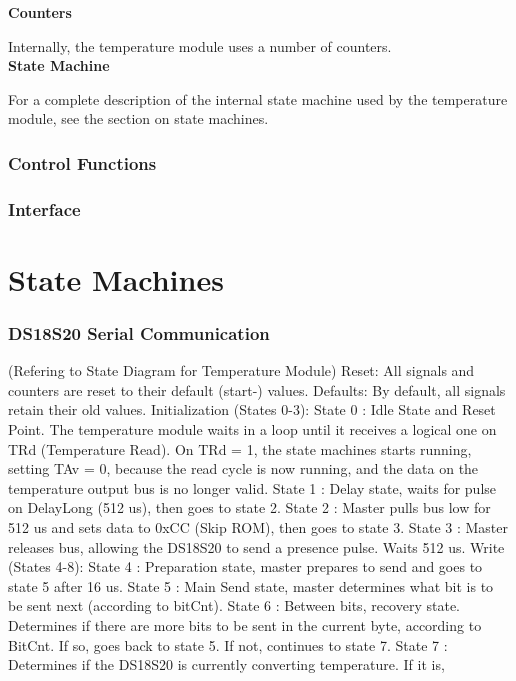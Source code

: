\documentclass[a4paper,11pt]{article}
\begin{document}
{\noindent \bf Counters}

Internally, the temperature module uses a number of counters.\\

{\noindent \bf State Machine}
	
For a complete description of the internal state machine used by the temperature module, see the section
on state machines.\\

		\subsubsection{Control Functions}

		\subsubsection{Interface}

\section{State Machines}
		\subsubsection{DS18S20 Serial Communication}
			(Refering to State Diagram for Temperature Module)
			Reset: All signals and counters are reset to their default (start-) values.
			Defaults: By default, all signals retain their old values.
			Initialization (States 0-3):
				State 0 : Idle State and Reset Point. The temperature module waits
						in a loop until it receives a logical one on TRd (Temperature Read).
						On TRd = 1, the state machines starts running, setting TAv = 0,
						because the read cycle is now running, and the data on the temperature
						output bus is no longer valid.
				State 1 : Delay state, waits for pulse on DelayLong (512 us), then goes to state 2.
				State 2 : Master pulls bus low for 512 us and sets data to 0xCC (Skip ROM), then goes to state 3.
				State 3 : Master releases bus, allowing the DS18S20 to send a presence pulse. Waits 512 us.
			Write (States 4-8):
				State 4 : Preparation state, master prepares to send and goes to state 5 after 16 us.
				State 5 : Main Send state, master determines what bit is to be sent next (according to bitCnt).
				State 6 : Between bits, recovery state. Determines if there are more bits to be sent in the current
					  byte, according to BitCnt. If so, goes back to state 5. If not, continues to state 7.
				State 7 : Determines if the DS18S20 is currently converting temperature. If it is, 
					  
\end{document}

